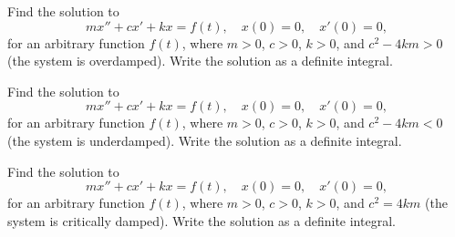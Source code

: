 \begin{exercise}
Find the solution to
\begin{equation*}
m x'' + c x' + k x = f(t) , \quad x(0) = 0, \quad x'(0) = 0 ,
\end{equation*}
for an arbitrary function $f(t)$, where $m > 0$, $c > 0$, $k > 0$,
and $c^2 - 4km > 0$ (the system is overdamped).
Write the solution as a definite integral.
\end{exercise}


\begin{exercise}
Find the solution to
\begin{equation*}
m x'' + c x' + k x = f(t) , \quad x(0) = 0, \quad x'(0) = 0 ,
\end{equation*}
for an arbitrary function $f(t)$, where $m > 0$, $c > 0$, $k > 0$,
and $c^2 - 4km < 0$ (the system is underdamped).
Write the solution as a definite integral.
\end{exercise}

\begin{exercise}
Find the solution to
\begin{equation*}
m x'' + c x' + k x = f(t) , \quad x(0) = 0, \quad x'(0) = 0 ,
\end{equation*}
for an arbitrary function $f(t)$, where $m > 0$, $c > 0$, $k > 0$,
and $c^2 = 4km$ (the system is critically damped).
Write the solution as a definite integral.
\end{exercise}

